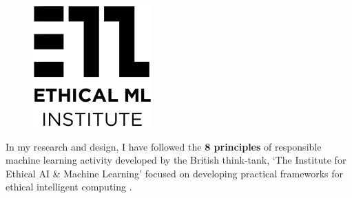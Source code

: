 \begin{figure}
	\centering
	\vspace{-\intextsep}
	\hspace{-1\columnsep}
	\includegraphics[width=1.0\linewidth, keepaspectratio]{images/misc/eml.png}
	\vspace{-10pt}
\end{figure}
In my research and design, I have followed the \textbf{8 principles} of responsible machine learning activity developed by the British think-tank, `The Institute for Ethical AI \& Machine Learning' focused on developing practical frameworks for ethical intelligent computing \parencite*{the_institute_for_ethical_ai_&_machine_learning_machine_2019}.

